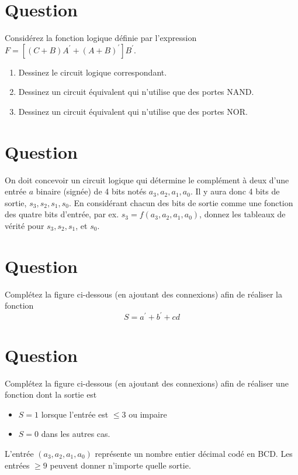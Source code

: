 \documentclass[letter, oneside]{book}
\begin{document}
\section*{Question}
\label{sec:orgb1ca06f}
Considérez la fonction logique définie par l'expression \(F =
      [ (C + B) A^{\prime} + (A+B)^{\prime} ] B^{\prime}\).

\begin{enumerate}
\item Dessinez le circuit logique correspondant.

\item Dessinez un circuit équivalent qui n'utilise que des portes
NAND.

\item Dessinez un circuit équivalent qui n'utilise que des portes
NOR.
\end{enumerate}

\section*{Question}
\label{sec:org5b8cae2}
On doit concevoir un circuit logique qui détermine le complément à deux
  d'une entrée \(a\) binaire (signée) de 4 bits notés
  \(a_3, a_2, a_1, a_0\). Il y aura donc 4 bits de sortie, \(s_3,
      s_2, s_1, s_0\). En considérant chacun des bits de sortie comme une
  fonction des quatre bits d'entrée, par ex. \(s_3 = f(a_3, a_2, a_1,
      a_0)\), donnez les tableaux de vérité pour \(s_3, s_2, s_1\), et \(s_0\).

\section*{Question}
\label{sec:org1d3f65b}
Complétez la figure ci-dessous (en ajoutant des connexions) afin de
  réaliser la fonction 
  $$
    S= a^\prime + b^\prime + c d
    $$
  \begin{center}

\end{center}

\section*{Question}
\label{sec:org82fa9c3}
Complétez la figure ci-dessous (en ajoutant des connexions) afin de
  réaliser une fonction dont la sortie est 
\begin{itemize}
\item \(S=1\) lorsque l'entrée est \(\leq 3\) ou impaire
\item \(S=0\) dans les autres cas.
\end{itemize}
    L'entrée \((a_3,a_2,a_1, a_0)\) représente un nombre entier
   décimal codé en BCD. Les entrées \(\geq 9\) peuvent donner
   n'importe quelle sortie.
\begin{center}

\end{center}
\end{document}
